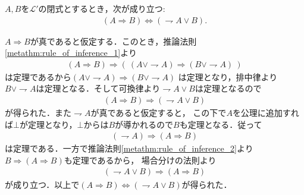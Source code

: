 	\begin{screen}
		\begin{metathm}[ならばとまたは]\label{metathm:rule_of_inference_3}
			$A,B$を$\mathcal{L}'$の閉式とするとき，次が成り立つ:
			\begin{align}
				(A \Longrightarrow B) \Longleftrightarrow (\rightharpoondown A \vee B).
			\end{align}
		\end{metathm}
	\end{screen}
	
	\begin{prf}
		$A \Longrightarrow B$が真であると仮定する．このとき，推論法則\ref{metathm:rule_of_inference_1}より
		\begin{align}
			(A \Longrightarrow B) \Longrightarrow 
			(\ (A \vee \rightharpoondown A) \Longrightarrow (B \vee \rightharpoondown A)\ )
		\end{align}
		は定理であるから$(A \vee \rightharpoondown A) \Longrightarrow (B \vee \rightharpoondown A)$
		は定理となり，排中律より$B \vee \rightharpoondown A$は定理となる．そして可換律より$\rightharpoondown A \vee B$は定理となるので
		\begin{align}
			(A \Longrightarrow B) \Longrightarrow (\rightharpoondown A \vee B)
		\end{align}
		が得られた．また$\rightharpoondown A$が真であると仮定すると，
		この下で$A$を公理に追加すれば$\bot$が定理となり，$\bot$からは$B$が導かれるので$B$も定理となる．従って
		\begin{align}
			(\rightharpoondown A) \Longrightarrow (A \Longrightarrow B)
		\end{align}
		は定理である．一方で推論法則\ref{metathm:rule_of_inference_2}より$B \Longrightarrow (A \Longrightarrow B)$も定理であるから，
		場合分けの法則より
		\begin{align}
			(\rightharpoondown A \vee B) \Longrightarrow (A \Longrightarrow B)
		\end{align}
		が成り立つ．以上で$(A \Longrightarrow B) \Longleftrightarrow (\rightharpoondown A \vee B)$が得られた．
		\QED
	\end{prf}
	
	
